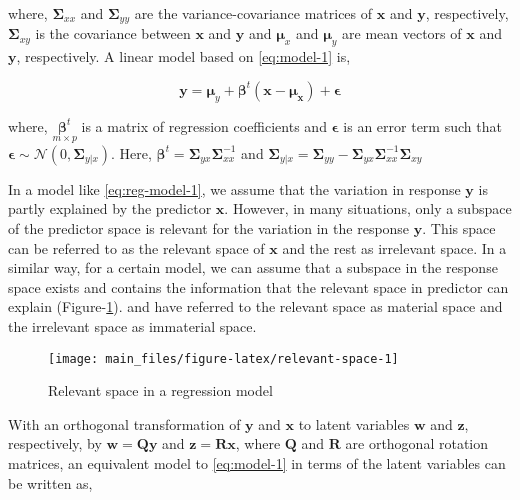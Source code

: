 \documentclass[review]{elsarticle}
\begin{document}
where, \(\boldsymbol{\Sigma}_{xx}\) and \(\boldsymbol{\Sigma}_{yy}\) are
the variance-covariance matrices of \(\mathbf{x}\) and \(\mathbf{y}\),
respectively, \(\boldsymbol{\Sigma}_{xy}\) is the covariance between
\(\mathbf{x}\) and \(\mathbf{y}\) and \(\boldsymbol{\mu}_x\) and
\(\boldsymbol{\mu}_y\) are mean vectors of \(\mathbf{x}\) and
\(\mathbf{y}\), respectively. A linear model based on \eqref{eq:model-1}
is,

\begin{equation}
\mathbf{y} = \boldsymbol{\mu}_y + 
  \boldsymbol{\beta}^t(\mathbf{x} - \boldsymbol{\mu_x}) + 
  \boldsymbol{\epsilon}
\label{eq:reg-model-1}
\end{equation}

where, \(\underset{m\times p}{\boldsymbol{\beta}^t}\) is a matrix of
regression coefficients and \(\boldsymbol{\epsilon}\) is an error term
such that
\(\boldsymbol{\epsilon} \sim \mathcal{N}(0, \boldsymbol{\Sigma}_{y|x})\).
Here,
\(\boldsymbol{\beta}^t = \mathbf{\Sigma}_{yx}\mathbf{\Sigma}_{xx}^{-1}\)
and
\(\boldsymbol{\Sigma}_{y|x} = \boldsymbol{\Sigma}_{yy} - \boldsymbol{\Sigma}_{yx}\boldsymbol{\Sigma}_{xx}^{-1}\boldsymbol{\Sigma}_{xy}\)

In a model like \eqref{eq:reg-model-1}, we assume that the variation in
response \(\mathbf{y}\) is partly explained by the predictor
\(\mathbf{x}\). However, in many situations, only a subspace of the
predictor space is relevant for the variation in the response
\(\mathbf{y}\). This space can be referred to as the relevant space of
\(\mathbf{x}\) and the rest as irrelevant space. In a similar way, for a
certain model, we can assume that a subspace in the response space
exists and contains the information that the relevant space in predictor
can explain (Figure-\ref{fig:relevant-space}). \citet{cook2010envelope}
and \citet{cook2015simultaneous} have referred to the relevant space as
material space and the irrelevant space as immaterial space.

\begin{figure}

{\centering \texttt{[image: main\_files/figure-latex/relevant-space-1]} 

}

\caption{Relevant space in a regression model}\label{fig:relevant-space}
\end{figure}

With an orthogonal transformation of \(\mathbf{y}\) and \(\mathbf{x}\)
to latent variables \(\mathbf{w}\) and \(\mathbf{z}\), respectively, by
\(\mathbf{w=Qy}\) and \(\mathbf{z = Rx}\), where \(\mathbf{Q}\) and
\(\mathbf{R}\) are orthogonal rotation matrices, an equivalent model to
\eqref{eq:model-1} in terms of the latent variables can be written as,
\end{document}
